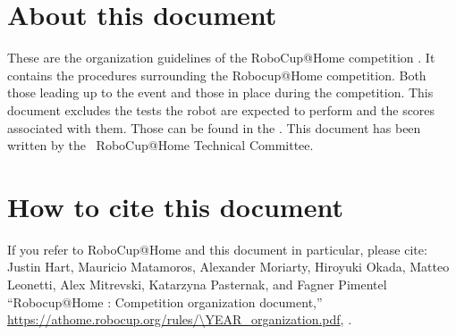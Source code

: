 


\section*{About this document}
These are the organization guidelines of the RoboCup@Home competition \YEAR. It contains the procedures surrounding the Robocup@Home competition. Both those leading up to the event and those in place during the competition. This document excludes the tests the robot are expected to perform and the scores associated with them. Those can be found in the \Rulebook.
This document has been written by the \YEAR ~RoboCup@Home Technical Committee.

\section*{How to cite this document}
If you refer to RoboCup@Home and this document in particular, please cite:\\

\noindent Justin Hart, Mauricio Matamoros, Alexander Moriarty, Hiroyuki Okada,
Matteo Leonetti, Alex Mitrevski, Katarzyna Pasternak, and Fagner Pimentel
\enquote{Robocup@Home \YEAR: Competition organization document,}
\url{https://athome.robocup.org/rules/\YEAR_organization.pdf}, \YEAR.

\begin{center}
	\begin{minipage}{0.8\textwidth}
		\footnotesize%
		
	\end{minipage}
\end{center}


